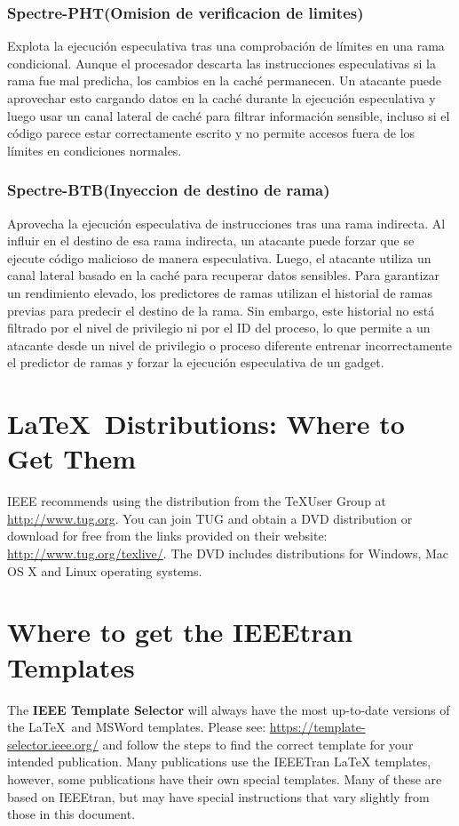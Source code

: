 \documentclass[lettersize,compsoc]{IEEEtran}
\begin{document}
\subsubsection{\textbf{Spectre-PHT(Omision de verificacion de limites)}}
\noindent Explota la ejecución especulativa tras una comprobación de límites en una rama condicional. Aunque el procesador descarta las instrucciones especulativas si la rama fue mal predicha, los cambios en la caché permanecen.
\noindent Un atacante puede aprovechar esto cargando datos en la caché durante la ejecución especulativa y luego usar un canal lateral de caché para filtrar información sensible, incluso si el código parece estar correctamente escrito y no permite accesos fuera de los límites en condiciones normales.
\subsubsection{\textbf{Spectre-BTB(Inyeccion de destino de rama)}}
\noindent Aprovecha la ejecución especulativa de instrucciones tras una rama indirecta. Al influir en el destino de esa rama indirecta, un atacante puede forzar que se ejecute código malicioso de manera especulativa. Luego, el atacante utiliza un canal lateral basado en la caché para recuperar datos sensibles.
\noindent Para garantizar un rendimiento elevado, los predictores de ramas utilizan el historial de ramas previas para predecir el destino de la rama. Sin embargo, este historial no está filtrado por el nivel de privilegio ni por el ID del proceso, lo que permite a un atacante desde un nivel de privilegio o proceso diferente entrenar incorrectamente el predictor de ramas y forzar la ejecución especulativa de un gadget.

\section{\LaTeX \ Distributions: Where to Get Them}
\noindent IEEE recommends using the distribution from the \TeX User Group at \url{http://www.tug.org}. You can join TUG and obtain a DVD distribution or download for free  from the links provided on their website: \url{http://www.tug.org/texlive/}. The DVD includes distributions for Windows, Mac OS X and Linux operating systems.
 

\section{Where to get the IEEEtran Templates}
\noindent The {\bf{IEEE Template Selector}} will always have the most up-to-date versions of the \LaTeX\ and MSWord templates. Please see: \url{https://template-selector.ieee.org/} and follow the steps to find the correct template for your intended publication. Many publications use the IEEETran LaTeX templates, however, some publications have their own special templates. Many of these are  based on IEEEtran, but may have special instructions that vary slightly from those in this document.
\end{document}
